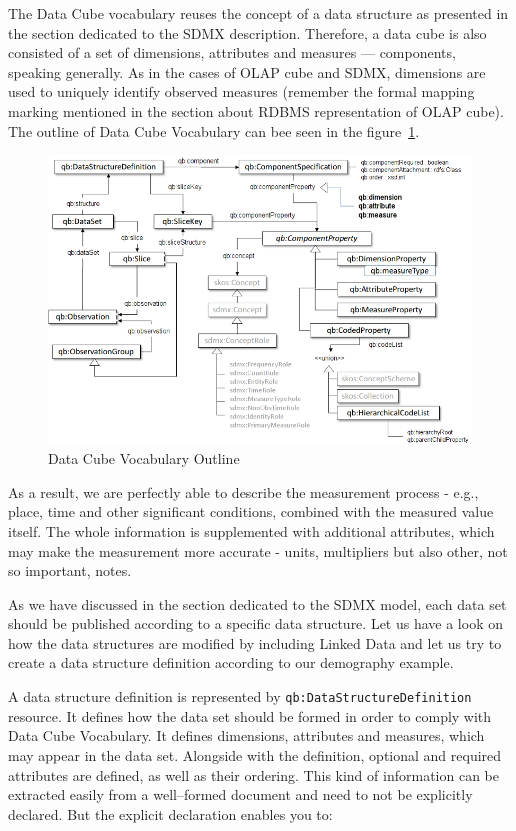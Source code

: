 The Data Cube vocabulary reuses the concept of a data structure as presented in the section
dedicated to the SDMX description. Therefore, a data cube is also consisted of a set of
dimensions, attributes and measures --- components, speaking generally. As in the cases of
OLAP cube and SDMX, dimensions are used to uniquely identify observed measures
(remember the formal mapping marking mentioned in the section about RDBMS representation
of OLAP cube). The outline of Data Cube Vocabulary can bee seen in the 
figure~\ref{fig:lod-cloud}.
 
\begin{figure}
	\centering
	\includegraphics[width=150mm]{img/dcv-schema.png}
	\caption{Data Cube Vocabulary Outline~\cite{dcv}}
	\label{fig:lod-cloud}
\end{figure}

As a result, we are perfectly able to describe the measurement process - e.g., place, time and
other significant conditions, combined with the measured value itself. The whole information
is supplemented with additional attributes, which may make the measurement more accurate
- units, multipliers but also other, not so important, notes.

As we have discussed in the section dedicated to the SDMX model, each data set should be
published according to a specific data structure. Let us have a look on how the data structures are
modified by including Linked Data and let us try to create a data structure definition according
to our demography example.

A data structure definition is represented by \texttt{qb:DataStructureDefinition} resource. It defines
how the data set should be formed in order to comply with Data Cube Vocabulary. It defines
dimensions, attributes and measures, which may appear in the data set. Alongside with the
definition, optional and required attributes are defined, as well as their ordering. This kind
of information can be extracted easily from a well--formed document and need to not be explicitly
declared. But the explicit declaration enables you to:

